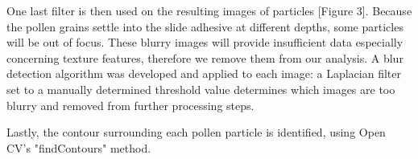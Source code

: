 
One last filter is then used on the resulting images of particles [Figure 3]. Because the pollen grains settle into the slide adhesive at different depths, some particles will be out of focus. These blurry images will provide insufficient data especially concerning texture features, therefore we remove them from our analysis. A blur detection algorithm was developed and applied to each image: a Laplacian filter set to a manually determined threshold value determines which images are too blurry and removed from further processing steps. 

Lastly, the contour surrounding each pollen particle is identified, using Open CV's "findContours" method. 

  